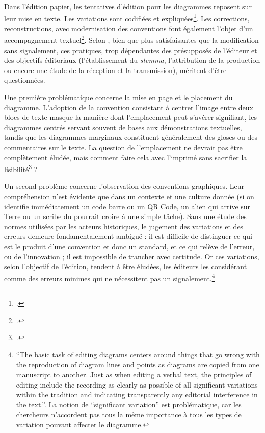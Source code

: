Dans l'édition papier, les tentatives d'édition pour les diagrammes
reposent sur leur mise en texte. Les variations sont codifiées et
expliquées\footcite[Voir les édition de]{de_young_editing_2014}.
Les corrections, reconstructions, avec modernisation des conventions
font également l'objet d'un accompagnement textuel\footcite[p.395]{jardine_critical_2010}.
Selon \citeauthor{jardine_critical_2010}, bien que plus satisfaisantes que la
modification sans signalement, ces pratiques, trop dépendantes des
présupposés de l'éditeur et des objectifs éditoriaux (l'établissement du
\textit{stemma}, l'attribution de la production ou encore une étude de la
réception et la transmission), méritent d'être questionnées.

Une première problématique concerne la mise en page et le placement du
diagramme. L'adoption de la convention consistant à centrer l'image
entre deux blocs de texte masque la manière dont l'emplacement peut
s'avérer signifiant, les diagrammes centrés servant souvent de bases aux
démonstrations textuelles, tandis que les diagrammes marginaux
constituent généralement des gloses ou des commentaires sur le texte. La
question de l'emplacement ne devrait pas être complètement éludée, mais
comment faire cela avec l'imprimé sans sacrifier la lisibilité\footcite[p.400]{jardine_critical_2010} ? 

Un second problème concerne l'observation des conventions graphiques.
Leur compréhension n'est évidente que dans un contexte et une culture
donnée (si on identifie immédiatement un code barre ou un QR Code, un
alien qui arrive sur Terre ou un scribe du \ma pourrait croire à
une simple tâche). Sans une étude des normes utilisées par les acteurs
historiques, le jugement des variations et des erreurs demeure
fondamentalement ambiguë : il est difficile de distinguer ce qui est le
produit d'une convention et donc un standard, et ce qui relève de
l'erreur, ou de l'innovation ; il est impossible de trancher avec
certitude. Or ces variations, selon l'objectif de l'édition, tendent à
être éludées, les éditeurs les considérant comme des erreurs minimes qui
ne nécessitent pas un signalement.\footnote{``The basic task of editing
  diagrams centers around things that go wrong with the reproduction of
  diagram lines and points as diagrams are copied from one manuscript to
  another. Just as when editing a verbal text, the principles of editing
  include the recording as clearly as possible of all significant
  variations within the tradition and indicating transparently any
  editorial interference in the text.''\cite[p.229]{de_young_editing_2014}. La
  notion de ``significant variation'' est problématique, car les
  chercheurs n'accordent pas tous la même importance à tous les types de
  variation pouvant affecter le diagramme.}

